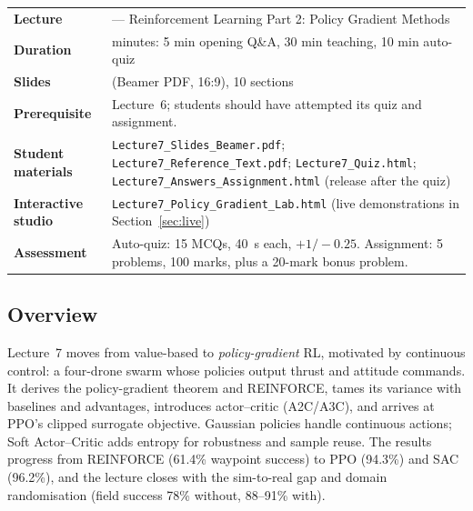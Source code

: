 \documentclass[11pt]{article}
\begin{document}
\begin{center}\small\renewcommand{\arraystretch}{1.25}\begin{tabularx}{\textwidth}{@{}>{\bfseries}p{3.3cm}>{\raggedright\arraybackslash}X@{}}\toprule

\textcolor{NavyN}{Lecture}&7 --- Reinforcement Learning Part 2: Policy Gradient Methods\\
\textcolor{NavyN}{Duration}&45 minutes: 5 min opening Q\&A, 30 min teaching, 10 min auto-quiz\\
\textcolor{NavyN}{Slides}&19 (Beamer PDF, 16:9), 10 sections\\
\textcolor{NavyN}{Prerequisite}&Lecture~6; students should have attempted its quiz and assignment.\\
\textcolor{NavyN}{Student materials}&\texttt{Lecture7\_Slides\_Beamer.pdf}; \texttt{Lecture7\_Reference\_Text.pdf}; \texttt{Lecture7\_Quiz.html}; \texttt{Lecture7\_Answers\_Assignment.html} (release after the quiz)\\
\textcolor{NavyN}{Interactive studio}&\texttt{Lecture7\_Policy\_Gradient\_Lab.html} (live demonstrations in Section~\ref{sec:live})\\
\textcolor{NavyN}{Assessment}&Auto-quiz: 15 MCQs, 40~s each, $+1/-0.25$. Assignment: 5 problems, 100 marks, plus a 20-mark bonus problem.\\\bottomrule\end{tabularx}\end{center}

\subsection*{Overview}Lecture~7 moves from value-based to \emph{policy-gradient} RL, motivated by continuous control: a four-drone swarm whose policies output thrust and attitude commands. It derives the policy-gradient theorem and REINFORCE, tames its variance with baselines and advantages, introduces actor--critic (A2C/A3C), and arrives at PPO's clipped surrogate objective. Gaussian policies handle continuous actions; Soft Actor--Critic adds entropy for robustness and sample reuse. The results progress from REINFORCE (61.4\% waypoint success) to PPO (94.3\%) and SAC (96.2\%), and the lecture closes with the sim-to-real gap and domain randomisation (field success 78\% without, 88--91\% with).
\end{document}
